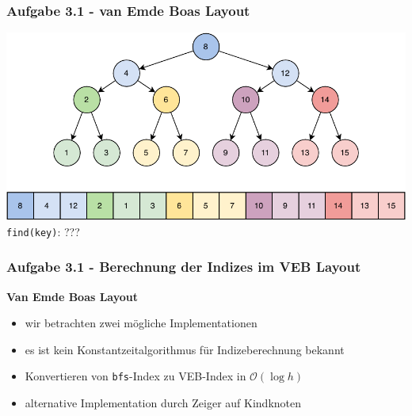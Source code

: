 \documentclass[aspectratio=169]{beamer}
\begin{document}
\begin{frame}
	\frametitle{Aufgabe 3.1 - van Emde Boas Layout}
	
	
	\begin{center}
		\includegraphics[scale=.8]{veb_layout.pdf}\\
		\centering \texttt{find(key)}: ???	
	\end{center}
	\end{frame}
\begin{frame}
	\frametitle{Aufgabe 3.1 - Berechnung der Indizes im VEB Layout}
	
	\textbf{Van Emde Boas Layout}
	\begin{itemize}
		\item wir betrachten zwei mögliche Implementationen
		\item es ist kein Konstantzeitalgorithmus für Indizeberechnung bekannt
		\item Konvertieren von \texttt{bfs}-Index zu VEB-Index in $\mathcal{O}(\log h)$
		\item alternative Implementation durch Zeiger auf Kindknoten
	\end{itemize}

	\end{frame}
\end{document}
